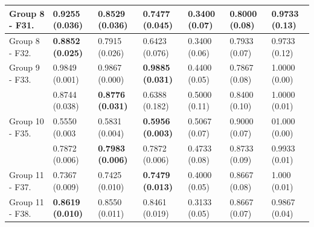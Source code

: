 \begin{center}
\begin{table}[!t]
\begin{tabular}{ccccccc}
		\multicolumn{1}{|l|}{Group 8 - F31.}           & \multicolumn{1}{l}{\textbf{0.9255 (0.036)}} & \multicolumn{1}{l}{0.8529 (0.036)} & \multicolumn{1}{l|}{0.7477 (0.045)}		& \multicolumn{1}{l}{0.3400 (0.07)} & \multicolumn{1}{l}{0.8000 (0.08)} & \multicolumn{1}{l|}{0.9733 (0.13)}  \\ \hline
		\multicolumn{1}{|l|}{Group 8 - F32.}              & \multicolumn{1}{l}{\textbf{0.8852 (0.025)}} & \multicolumn{1}{l}{0.7915 (0.026)} & \multicolumn{1}{l|}{0.6423 (0.076)}  		& \multicolumn{1}{l}{0.3400 (0.06)} & \multicolumn{1}{l}{0.7933 (0.07)} & \multicolumn{1}{l|}{0.9733 (0.12)}  \\ \hline
		\multicolumn{1}{|l|}{Group 9 - F33.}  & \multicolumn{1}{l}{0.9849 (0.001)} & \multicolumn{1}{l}{0.9867 (0.000)} & \multicolumn{1}{l|}{\textbf{0.9885 (0.031)}}  		& \multicolumn{1}{l}{0.4400 (0.05)} & \multicolumn{1}{l}{0.7867 (0.08)} & \multicolumn{1}{l|}{1.0000 (0.00)} \\ \hline
		\rowcolor[gray]{.85}  \multicolumn{1}{|l|}{Group 9 - F34.}              & \multicolumn{1}{l}{0.8744 (0.038)} & \multicolumn{1}{l}{\textbf{0.8776 (0.031)}} & \multicolumn{1}{l|}{0.6388 (0.182)}  		& \multicolumn{1}{l}{0.5000 (0.11)} & \multicolumn{1}{l}{0.8400 (0.10)} & \multicolumn{1}{l|}{1.0000 (0.01)}  \\ \hline
		\multicolumn{1}{|l|}{Group 10 - F35.}  & \multicolumn{1}{l}{0.5550 (0.003} & \multicolumn{1}{l}{0.5831 (0.004)} & \multicolumn{1}{l|}{\textbf{0.5956 (0.003)}}  		& \multicolumn{1}{l}{0.5067 (0.07)} & \multicolumn{1}{l}{0.9000 (0.07)} & \multicolumn{1}{l|}{01.000 (0.00)} \\ \hline
		\rowcolor[gray]{.85}  \rowcolor[gray]{.85}  \multicolumn{1}{|l|}{Group 10 - F36.}              & \multicolumn{1}{l}{0.7872 (0.006)} & \multicolumn{1}{l}{\textbf{0.7983 (0.006)}} & \multicolumn{1}{l|}{0.7872 (0.006)}  		& \multicolumn{1}{l}{0.4733 (0.08)} & \multicolumn{1}{l}{0.8733 (0.09)} & \multicolumn{1}{l|}{0.9933 (0.01)}  \\ \hline
		\multicolumn{1}{|l|}{Group 11 - F37.}  & \multicolumn{1}{l}{0.7367 (0.009)} & \multicolumn{1}{l}{0.7425 (0.010)} & \multicolumn{1}{l|}{\textbf{0.7479 (0.013)}}  		& \multicolumn{1}{l}{0.4000 (0.05)} & \multicolumn{1}{l}{0.8667 (0.08)} & \multicolumn{1}{l|}{1.000 (0.01)} \\ \hline
		\multicolumn{1}{|l|}{Group 11 - F38.}              & \multicolumn{1}{l}{\textbf{0.8619 (0.010)}} & \multicolumn{1}{l}{0.8550 (0.011)} & \multicolumn{1}{l|}{0.8461 (0.019)}  		& \multicolumn{1}{l}{0.3133 (0.05)} & \multicolumn{1}{l}{0.8667 (0.07)} & \multicolumn{1}{l|}{0.9867 (0.04)}  \\ \hline

\end{tabular}
\end{table}
\end{center}
